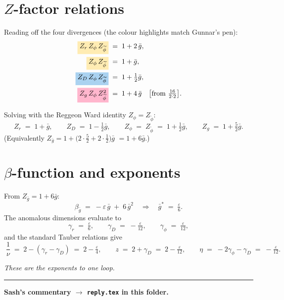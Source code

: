 \documentclass[11pt,a4paper]{article}
\newcommand{\hl}[1]{\colorbox{gunnaryellow}{$#1$}}
\newcommand{\hpink}[1]{\colorbox{gunnarpink}{$#1$}}
\newcommand{\hblue}[1]{\colorbox{gunnarblue}{$#1$}}
\begin{document}
\section*{$Z$-factor relations}

Reading off the four divergences (the colour highlights match Gunnar's pen):
\begin{align*}
\hl{Z_{r}\,Z_{\phi}\,Z_{\widetilde\phi}} &\;=\; 1 + 2\,\bar g, \\
\hl{Z_{\phi}\,Z_{\widetilde\phi}}        &\;=\; 1 + \bar g, \\
\hblue{Z_{D}\,Z_{\phi}\,Z_{\widetilde\phi}} &\;=\; 1 + \tfrac{1}{2}\bar g, \\
\hpink{Z_{g}\,Z_{\phi}\,Z_{\widetilde\phi}^{2}} &\;=\; 1 + 4\,\bar g
\quad\bigl[\text{from }\tfrac{16}{2\cdot 2}\bigr].
\end{align*}

Solving with the Reggeon Ward identity $Z_{\phi} = Z_{\widetilde\phi}$:
\[
Z_{r} \;=\; 1 + \bar g,\qquad
Z_{D} \;=\; 1 - \tfrac{1}{2}\bar g,\qquad
Z_{\phi} \;=\; Z_{\widetilde\phi} \;=\; 1 + \tfrac{1}{2}\bar g,\qquad
Z_{g} \;=\; 1 + \tfrac{5}{2}\bar g.
\]
(Equivalently $Z_{\bar g} = 1 + \bigl(2\cdot\tfrac{5}{2} + 2\cdot\tfrac{1}{2}\bigr)\bar g$
$=1+6\bar g$.)

\section*{$\beta$-function and exponents}

From $Z_{\bar g} = 1 + 6\bar g$:
\[
\beta_{\bar g} \;=\; -\varepsilon\,\bar g \;+\; 6\,\bar g^{2}
\quad\Longrightarrow\quad
\bar g^{*} \;=\; \tfrac{\varepsilon}{6}.
\]
The anomalous dimensions evaluate to
\[
\gamma_{r} \;=\; \tfrac{\varepsilon}{6},\qquad
\gamma_{D} \;=\; -\tfrac{\varepsilon}{12},\qquad
\gamma_{\phi} \;=\; \tfrac{\varepsilon}{12},
\]
and the standard Tauber relations give
\[
\boxed{\;
\frac{1}{\nu} \;=\; 2 - (\gamma_{r}-\gamma_{D}) \;=\; 2 - \tfrac{\varepsilon}{4},
\qquad
z \;=\; 2 + \gamma_{D} \;=\; 2 - \tfrac{\varepsilon}{12},
\qquad
\eta \;=\; -2\gamma_{\phi} - \gamma_{D} \;=\; -\tfrac{\varepsilon}{12}.
\;}
\]

\medskip
\textit{These are the exponents to one loop.}

\bigskip
\hrule
\medskip

\textbf{Sash's commentary $\rightarrow$ \texttt{reply.tex} in this folder.}
\end{document}
